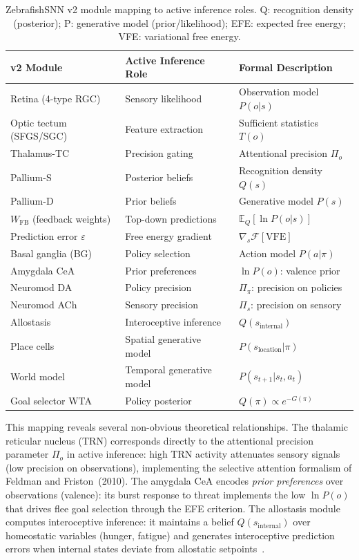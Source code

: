 \documentclass[11pt,a4paper]{article}
\begin{document}
\begin{table}[H]
\centering
\caption{ZebrafishSNN v2 module mapping to active inference roles.
  Q: recognition density (posterior); P: generative model (prior/likelihood);
  EFE: expected free energy; VFE: variational free energy.}
\label{tab:active_inference_map}
\small
\begin{tabular}{lll}
\toprule
v2 Module & Active Inference Role & Formal Description \\
\midrule
Retina (4-type RGC)   & Sensory likelihood & Observation model $P(o|s)$ \\
Optic tectum (SFGS/SGC) & Feature extraction & Sufficient statistics $T(o)$ \\
Thalamus-TC           & Precision gating   & Attentional precision $\Pi_o$ \\
Pallium-S             & Posterior beliefs  & Recognition density $Q(s)$ \\
Pallium-D             & Prior beliefs      & Generative model $P(s)$ \\
$W_\mathrm{FB}$ (feedback weights) & Top-down predictions & $\mathbb{E}_Q[\ln P(o|s)]$ \\
Prediction error $\varepsilon$ & Free energy gradient & $\nabla_s \mathcal{F}[\text{VFE}]$ \\
Basal ganglia (BG)    & Policy selection   & Action model $P(a|\pi)$ \\
Amygdala CeA          & Prior preferences  & $\ln P(o)$: valence prior \\
Neuromod DA           & Policy precision   & $\Pi_\pi$: precision on policies \\
Neuromod ACh          & Sensory precision  & $\Pi_s$: precision on sensory \\
Allostasis            & Interoceptive inference & $Q(s_\mathrm{internal})$ \\
Place cells           & Spatial generative model & $P(s_\mathrm{location}|\pi)$ \\
World model           & Temporal generative model & $P(s_{t+1}|s_t, a_t)$ \\
Goal selector WTA     & Policy posterior   & $Q(\pi) \propto e^{-G(\pi)}$ \\
\bottomrule
\end{tabular}
\end{table}

This mapping reveals several non-obvious theoretical relationships.
The thalamic reticular nucleus (TRN) corresponds directly to the
attentional precision parameter $\Pi_o$ in active inference: high
TRN activity attenuates sensory signals (low precision on observations),
implementing the selective attention formalism of Feldman and
Friston~(2010).
The amygdala CeA encodes \emph{prior preferences} over observations
(valence): its burst response to threat implements the low $\ln P(o)$
that drives flee goal selection through the EFE criterion.
The allostasis module computes interoceptive inference:
it maintains a belief $Q(s_\mathrm{internal})$ over homeostatic variables
(hunger, fatigue) and generates interoceptive prediction errors when
internal states deviate from allostatic setpoints~\cite{seth2016}.
\end{document}
